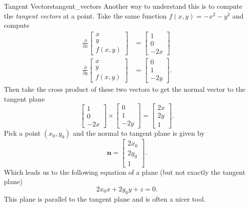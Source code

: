                                         \begin{ex}{Tangent Vectors}{tangent_vectors}
                                        Another way to understand this is to compute the \emph{tangent vectors} at a point. Take the same function $f(x,y)=-x^2-y^2$ and compute
                                        \begin{align*}
                                            \frac{\partial}{\partial x}\begin{bmatrix} x \\ y \\ f(x,y)\end{bmatrix} &= \begin{bmatrix} 1\\ 0 \\ -2x\end{bmatrix}\\
                                            \frac{\partial}{\partial y}\begin{bmatrix} x \\ y \\ f(x,y)\end{bmatrix} &= \begin{bmatrix} 0\\ 1 \\ -2y\end{bmatrix}.
                                        \end{align*}
                                        Then take the cross product of these two vectors to get the normal vector to the tangent plane
                                        \[
                                        \begin{bmatrix} 1 \\ 0 \\-2x\end{bmatrix} \times \begin{bmatrix} 0 \\ 1 \\ -2y\end{bmatrix} = \begin{bmatrix} 2x \\ 2y \\ 1\end{bmatrix}.
                                        \]
                                        Pick a point $(x_0,y_0)$ and the normal to tangent plane is given by
                                        \[
                                        \mathbf{n}=\begin{bmatrix} 2x_0 \\ 2y_0 \\ 1 \end{bmatrix}.
                                        \]
                                        Which leads us to the following equation of a plane (but not exactly the tangent plane)
                                        \[
                                        2x_0 x + 2y_0y+z=0.
                                        \]
                                        This plane is parallel to the tangent plane and is often a nicer tool.
                                        \end{ex}
                                        
